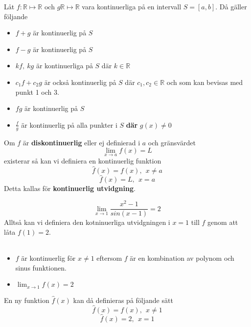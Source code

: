 \documentclass{report}
\begin{document}
{
	Låt $ f: \mathbb{R} \mapsto \mathbb{R} $ och $ g \mathbb{R} \mapsto \mathbb{R} $ vara kontinuerliga på en intervall $ S=[a,b] $. Då gäller följande
\begin{itemize}
	\item $ f+g $ är kontinuerlig på $ S $
	\item $ f-g $ är kontinuerlig på $ S $
	\item $ kf, \: kg $ är kontinuerliga på $ S $ där $ k \in \mathbb{R} $
	\item $ c_1 f+c_2 g $ är också kontinuerlig på $ S $ där $ c_1, c_2 \in \mathbb{R} $ och som kan bevisas med punkt 1 och 3.
	\item $ fg $ är kontinuerlig på $ S $   
	\item $ \frac{f}{g}  $ är kontinuerlig på alla punkter i $ S $ \textbf{där} $ g(x) \ne 0 $ 
\end{itemize}
}

\vspace{20pt}
\noindent
Om $ f $ är \textbf{diskontinuerlig} eller ej definierad i $ a $ och gränsvärdet
\begin{equation*}
\lim_{x \to a} f(x) = L
\end{equation*}
existerar så kan vi definiera en kontinuerlig funktion
\begin{equation*}
	\hat{f}(x) = f(x),\:\:x \ne a
\end{equation*}
\begin{equation*}
	\hat{f}(x) = L,\:\:x = a
\end{equation*}
Detta kallas för \textbf{kontinuerlig utvidgning}. 

{
\begin{equation*}
\lim_{x \to 1} \frac{x^2-1}{sin(x-1)} = 2
\end{equation*}
Alltså kan vi definiera den kotninuerliga utvidgningen i $ x=1 $ till $ f $ genom att låta $ f(1) = 2 $.\\\\

\begin{itemize}
	\item $ f $ är kontinuerlig för $ x \ne 1 $ eftersom $ f $ är en kombination av polynom och sinus funktionen.
	\item $ \lim_{x \to 1} f(x) = 2 $ 
\end{itemize} 
En ny funktion $ \hat{f}(x) $ kan då definieras på följande sätt
\begin{equation*}
	\hat{f}(x) = f(x),\:\:x \ne 1
\end{equation*}
\begin{equation*}
	\hat{f}(x) = 2,\:\:x = 1
\end{equation*}
}
\end{document}

